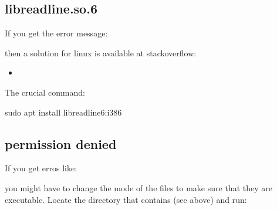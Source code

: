\documentclass[letterpaper,10pt,english]{sphinxmanual}
\begin{document}
\subsection{libreadline.so.6}
\label{\detokenize{Installation:libreadline-so-6}}
If you get the error message:

\begin{sphinxVerbatim}[commandchars=\\\{\}]
      
         
\end{sphinxVerbatim}

then a solution for linux is available at stackoverflow:
\begin{itemize}
\item {} 

\end{itemize}

The crucial command:

\begin{sphinxVerbatim}[commandchars=\\\{\}]
\PYGZdl{} sudo apt install libreadline6:i386
\end{sphinxVerbatim}


\subsection{permission denied}
\label{\detokenize{Installation:permission-denied}}
If you get  erros like:

\begin{sphinxVerbatim}[commandchars=\\\{\}]
 \PYG{p}{[} \PYG{p}{]}  
\end{sphinxVerbatim}

you might have to change the mode of the files to make sure that they are executable.
Locate the directory that contains  (see {\hyperref[\detokenize{Installation:installation-software}]{}} above) and run:
\end{document}
